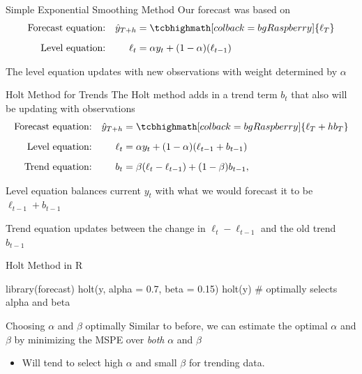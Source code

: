 \documentclass[aspectratio=169,t,11pt,table]{beamer}
\begin{document}
\begin{frame}{Simple Exponential Smoothing Method}
  Our forecast was based on
  \begin{align*}
    \text{Forecast equation:} && \hat{y}_{T+h} &= \tcbhighmath[colback = bgRaspberry]{\ell_{T}} \\[2mm]
    \text{Level equation:}    && \ell_{t} &= \alpha y_{t} + (1 - \alpha)(\ell_{t-1}) 
  \end{align*}
  
  \bigskip
  The level equation updates with new observations with weight determined by $\alpha$
\end{frame}

\begin{frame}{Holt Method for Trends}
  The Holt method adds in a trend term $b_t$ that also will be updating with observations
  \begin{align*}
    \text{Forecast equation:} && \hat{y}_{T+h} &= \tcbhighmath[colback = bgRaspberry]{\ell_{T} + hb_{T}} \\[2mm]
    \text{Level equation:}    && \ell_{t} &= \alpha y_{t} + (1 - \alpha)(\ell_{t-1} + b_{t-1}) \\[2mm]
    \text{Trend equation:}    && b_{t}    &= \beta(\ell_{t} - \ell_{t-1}) + (1 -\beta)b_{t-1},
  \end{align*}

  \bigskip 
  Level equation balances current $y_t$ with what we would forecast it to be $\ell_{t-1} + b_{t-1}$

  \bigskip
  Trend equation updates between the change in $\ell_t - \ell_{t-1}$ and the old trend $b_{t-1}$
\end{frame}


\begin{frame}[fragile]{Holt Method  in R}
  \vspace*{-\bigskipamount}
  \begin{codeblock}
library(forecast)
holt(y, alpha = 0.7, beta = 0.15)
holt(y) # optimally selects alpha and beta
  \end{codeblock}
\end{frame}

\begin{frame}{Choosing $\alpha$ and $\beta$ optimally}
  Similar to before, we can estimate the optimal $\alpha$ and $\beta$ by minimizing the MSPE over \emph{both} $\alpha$ and $\beta$

  \begin{itemize}
    \item Will tend to select high $\alpha$ and small $\beta$ for trending data. 
  \end{itemize}
\end{frame}
\end{document}
